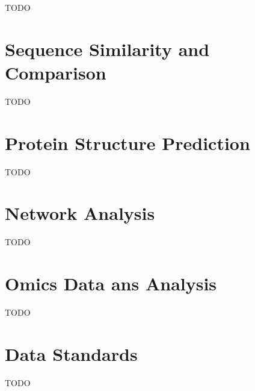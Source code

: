 \documentclass[a4paper]{article}
\begin{document}
TODO

\section{Sequence Similarity and Comparison}

TODO

\section{Protein Structure Prediction}

TODO

\section{Network Analysis}

TODO

\section{Omics Data ans Analysis}

TODO

\section{Data Standards}

TODO
\end{document}
